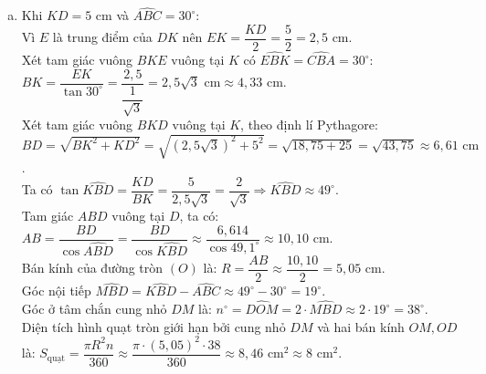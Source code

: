 \begin{bt}
{\begin{enumerate}[a)]
    $CA^2 = CM \cdot CB$.\\
    Chứng minh $E$ là trung điểm của $DK$:\\
    Ta có $DK \perp AB$ và $CA \perp AB$ (do tam giác $ABC$ vuông tại $A$) nên $DK \parallel CA$.\\
    Kéo dài $BD$ cắt đường thẳng $CA$ tại điểm $P$.\\
    Vì $\widehat{BAP} = 90^\circ$ và $AD \perp BP$ nên tam giác $BAP$ vuông tại $A$ có $AD$ là đường cao.\\
    Ta có $CA$ và $CD$ là hai tiếp tuyến của $(O)$ nên $CA = CD$.\\
    Lại có $\widehat{CPD} = 90^\circ - \widehat{PBA} = \widehat{DAB} = \widehat{CDA}$, do đó tam giác $CPD$ cân tại $C$, suy ra $CD = CP$.\\
    Từ đó ta có $CA = CP$, nghĩa là $C$ là trung điểm của đoạn thẳng $AP$.\\
    Trong tam giác $BAP$, vì $DK \parallel AP$, áp dụng hệ quả định lí Thales ta có:
    $\dfrac{EK}{CA} = \dfrac{BE}{BC} = \dfrac{ED}{CP}$.\\
    Vì $CA = CP$ nên $EK = ED$, suy ra $E$ là trung điểm của đoạn thẳng $DK$.
    \item Khi $KD = 5\text{ cm}$ và $\widehat{ABC} = 30^\circ$:\\
    Vì $E$ là trung điểm của $DK$ nên $EK = \dfrac{KD}{2} = \dfrac{5}{2} = 2{,}5\text{ cm}$.\\
    Xét tam giác vuông $BKE$ vuông tại $K$ có $\widehat{EBK} = \widehat{CBA} = 30^\circ$:\\
    $BK = \dfrac{EK}{\tan 30^\circ} = \dfrac{2{,}5}{\dfrac{1}{\sqrt{3}}} = 2{,}5\sqrt{3}\text{ cm} \approx 4{,}33\text{ cm}$.\\
    Xét tam giác vuông $BKD$ vuông tại $K$, theo định lí Pythagore:
    $BD = \sqrt{BK^2 + KD^2} = \sqrt{(2{,}5\sqrt{3})^2 + 5^2} = \sqrt{18{,}75 + 25} = \sqrt{43{,}75} \approx 6{,}61\text{ cm}$.\\
    Ta có $\tan \widehat{KBD} = \dfrac{KD}{BK} = \dfrac{5}{2{,}5\sqrt{3}} = \dfrac{2}{\sqrt{3}} \Rightarrow \widehat{KBD} \approx 49^\circ$.\\
    Tam giác $ABD$ vuông tại $D$, ta có:
    $AB = \dfrac{BD}{\cos \widehat{ABD}} = \dfrac{BD}{\cos \widehat{KBD}} \approx \dfrac{6{,}614}{\cos 49{,}1^\circ} \approx 10{,}10\text{ cm}$.\\
    Bán kính của đường tròn $(O)$ là:
    $R = \dfrac{AB}{2} \approx \dfrac{10{,}10}{2} = 5{,}05\text{ cm}$.\\
    Góc nội tiếp $\widehat{MBD} = \widehat{KBD} - \widehat{ABC} \approx 49^\circ - 30^\circ = 19^\circ$.\\
    Góc ở tâm chắn cung nhỏ $DM$ là:
    $n^\circ = \widehat{DOM} = 2 \cdot \widehat{MBD} \approx 2 \cdot 19^\circ = 38^\circ$.\\
    Diện tích hình quạt tròn giới hạn bởi cung nhỏ $DM$ và hai bán kính $OM, OD$ là:
    $S_{\text{quạt}} = \dfrac{\pi R^2 n}{360} \approx \dfrac{\pi \cdot (5{,}05)^2 \cdot 38}{360} \approx 8{,}46\text{ cm}^2 \approx 8\text{ cm}^2$.
\end{enumerate}
}
\end{bt}

